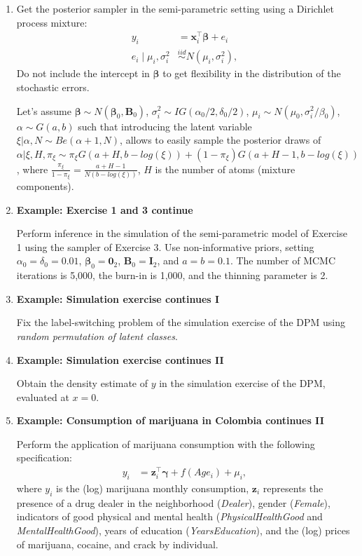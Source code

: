 \begin{enumerate}
	\item Get the posterior sampler in the semi-parametric setting using a Dirichlet process mixture:
	\begin{align*}
		y_i&=\boldsymbol{x}_i^{\top}\boldsymbol{\beta}+e_i\\
		e_i\mid \mu_i,\sigma_i^2 &\stackrel{iid}{\sim} N(\mu_i,\sigma_i^2),
	\end{align*}
	Do not include the intercept in $\boldsymbol{\beta}$ to get flexibility in the distribution of the stochastic errors.
	
	Let's assume $\boldsymbol{\beta}\sim N(\boldsymbol{\beta}_0,\boldsymbol{B}_0)$, $\sigma_i^2\sim IG(\alpha_0/2,\delta_0/2)$, $\mu_i\sim N(\mu_0,\sigma_i^2/\beta_0)$, $\alpha\sim G(a,b)$ such that introducing the latent variable $\xi|\alpha,N\sim Be(\alpha+1,N)$, allows to easily sample the posterior draws of  $\alpha|\xi,H,\pi_{\xi}\sim\pi_{\xi}{G}(a+H,b-log(\xi))+(1-\pi_{\xi}){G}(a+H-1,b-log(\xi))$, where $\frac{\pi_{\xi}}{1-\pi_{\xi}}=\frac{a+H-1}{N(b-log(\xi))}$, $H$ is the number of atoms (mixture components). 
	
	\item  \textbf{Example: Exercise 1 and 3 continue}
	
	Perform inference in the simulation of the semi-parametric model of Exercise 1 using the sampler of Exercise 3. Use non-informative priors, setting $\alpha_{0}=\delta_{0}=0.01$, $\boldsymbol{\beta}_{0}=\boldsymbol{0}_2$, $\boldsymbol{B}_{0}=\boldsymbol{I}_2$, and $a=b=0.1$. The number of MCMC iterations is 5,000, the burn-in is 1,000, and the thinning parameter is 2. 
	
	\item \textbf{Example: Simulation exercise continues I}
	
	Fix the label-switching problem of the simulation exercise of the DPM using \textit{random permutation of latent classes}.
	
	\item \textbf{Example: Simulation exercise continues II}
	
	Obtain the density estimate of $y$ in the simulation exercise of the DPM, evaluated at $x=0$.
	
	\item \textbf{Example: Consumption of marijuana in Colombia continues II}
	
	Perform the application of marijuana consumption with the following specification:
	\begin{align*}
		y_i & = \boldsymbol{z}_i^{\top} \boldsymbol{\gamma} + f(Age_{i}) + \mu_i,
	\end{align*}
	where $y_i$ is the (log) marijuana monthly consumption, $\boldsymbol{z}_i$ represents the presence of a drug dealer in the neighborhood (\textit{Dealer}), gender (\textit{Female}), indicators of good physical and mental health (\textit{PhysicalHealthGood} and \textit{MentalHealthGood}), years of education (\textit{YearsEducation}), and the (log) prices of marijuana, cocaine, and crack by individual.
	

\end{enumerate}

